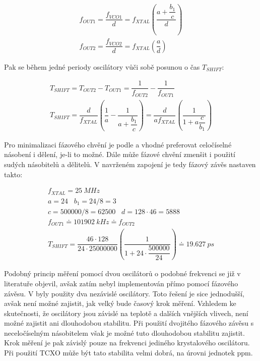 \begin{equation}
\begin{gathered}
f_{OUT1}=\dfrac{f_{VCO1}}{d}=f_{XTAL} \left(\dfrac{a+\dfrac{b_1}{c} }{d}\right) \\
f_{OUT2}=\dfrac{f_{VCO2}}{d}=f_{XTAL} \left(\dfrac{a}{d}\right)
\end{gathered}
\end{equation}

Pak se během jedné periody oscilátory vůči sobě posunou o čas $T_{SHIFT}$:

\begin{equation}
\begin{gathered}
T_{SHIFT}=T_{OUT2}-T_{OUT1}=\dfrac{1}{f_{OUT2}} - \dfrac{1}{f_{OUT1}} \\
T_{SHIFT}=\dfrac{d}{f_{XTAL}} \left(\dfrac{1}{a} - \dfrac{1}{a+\dfrac{b_1}{c}}\right) = \dfrac{d}{a f_{XTAL}} \left(\dfrac{1}{1+a\dfrac{c}{b_1}}\right)
\end{gathered}
\end{equation}

Pro minimalizaci fázového chvění je podle \cite{Si5351datasheet} a \cite{Si5351applicationnote} vhodné preferovat celočíselné násobení i dělení, je-li to možné. Dále může fázové chvění zmenšit i použití sudých násobitelů a dělitelů. V navrženém zapojení je tedy fázový závěs nastaven takto:

\begin{equation}
\begin{gathered}
f_{XTAL}=\SI{25}{MHz} \\
a=24 \;\;\; b_1=24/8=3 \\
c=500000/8=62500 \;\;\; d=128 \cdot 46=5888 \\
f_{OUT1} \doteq \SI{101902}{kHz} \doteq f_{OUT2} \\
T_{SHIFT} = \dfrac{46 \cdot 128}{24 \cdot 25000000} \left(\dfrac{1}{1+24 \cdot \dfrac{500000}{24}}\right) \doteq \SI{19.627}{ps}
\end{gathered}
\end{equation}

Podobný princip měření pomocí dvou oscilátorů o podobné frekvenci se již v literatuře objevil, avšak zatím nebyl implementován přímo pomocí fázového závěsu. V \cite{vernierreflectometer} byly použity dva nezávislé oscilátory. Toto řešení je sice jednodušší, avšak není možné zajistit, jak velký bude časový krok měření. Vzhledem ke skutečnosti, že oscilátory jsou závislé na teplotě a dalších vnějších vlivech, není možné zajistit ani dlouhodobou stabilitu. Při použití dvojitého fázového závěsu s neceločíselným násobitelem však je možné tuto dlouhodobou stabilitu zajistit. Krok měření je pak závislý pouze na frekvenci jediného krystalového oscilátoru. Při použití \acrshort{TCXO} může být tato stabilita velmi dobrá, na úrovni jednotek \si{ppm}.

